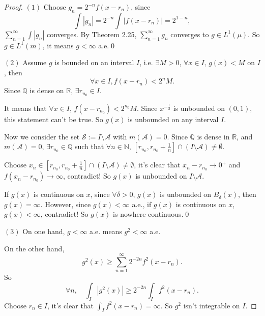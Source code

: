 \documentclass{article}
\newcommand{\Sc}{\mathcal{S}}
\newcommand{\A}{\mathcal{A}}
\newcommand{\sm}[2]{\sum_{#1=1}^{#2}}
\begin{document}
\begin{proof}
    $(1)$ Choose $g_{n}=2^{-n}f(x-r_{n})$, since 
    \begin{displaymath}
        \int |g_n|=2^{-n}\int |f(x-r_n)|=2^{1-n},
    \end{displaymath}    
    $\sm{n}{\infty}\int |g_{n}|$ converges. 
    By Theorem 2.25, $\sm{n}{\infty}g_n$ converges to 
    $g\in L^{1}(\mu)$. 
    So $g\in L^{1}(m)$, it means $g<\infty$ a.e.\qed
    
    $(2)$ Assume $g$ is bounded on an interval $I$, i.e. 
    $\exists M>0$, $\forall x\in I$, $g(x)<M$ on $I$, then 
    \begin{displaymath}
        \forall x\in I, f(x-r_{n})<2^{n}M.
    \end{displaymath}
    Since $\mathbb{Q}$ is dense on $\mathbb{R}$, 
    $\exists r_{n_{0}}\in I$. 

    It means that $\forall x\in I$, $f(x-r_{n_{0}})<2^{n_{0}}M$. 
    Since $x^{-\frac{1}{2}}$ is unbounded on $(0,1)$, 
    this statement can't be true. So $g(x)$ is unbounded on 
    any interval $I$.

    Now we consider the set $\Sc:=I\setminus\A$ with $m(\A)=0$. 
    Since $\mathbb{Q}$ is dense in $\mathbb{R}$, 
    and $m(\A)=0$,  
    $\exists r_{n_{0}}\in\mathbb{Q}$ such that 
    $\forall n\in\mathbb{N}$, 
    $[r_{n_{0}},r_{n_{0}}+\frac{1}{n}]\cap (I\setminus\A)\neq\emptyset$.

    Choose $x_{n}\in[r_{n_{0}},r_{n_{0}}+\frac{1}{n}]
    \cap (I\setminus\A)\neq\emptyset$, 
    it's clear that $x_{n}-r_{n_{0}}\rightarrow 0^{+}$ 
    and $f(x_{n}-r_{n_{0}})\rightarrow\infty$, 
    contradict! So $g(x)$ is unbounded on $I\setminus\A$.

    If $g(x)$ is continuous on $x$, since 
    $\forall\delta>0$, $g(x)$ is unbounded 
    on $B_{\delta}(x)$, then $g(x)=\infty$. 
    However, since $g(x)<\infty$ a.e., 
    if $g(x)$ is continuous on $x$, 
    $g(x)<\infty$, contradict! So $g(x)$ is nowhere continuous.\qed

    $(3)$ On one hand, $g<\infty$ a.e. means $g^{2}<\infty$ a.e.

    On the other hand, 
    \begin{displaymath}
        g^{2}(x)\ge\sm{n}{\infty}2^{-2n}f^{2}(x-r_n).
    \end{displaymath}
    So 
    \begin{displaymath}
        \forall n,\quad
        \int_{I}|g^{2}(x)|
        \ge 2^{-2n}\int_{I}f^{2}(x-r_{n}).
    \end{displaymath}
    Choose $r_{n}\in I$, it's clear that 
    $\int_{I}f^{2}(x-r_{n})=\infty$. 
    So $g^{2}$ isn't integrable on $I$.
\end{proof}
\end{document}
